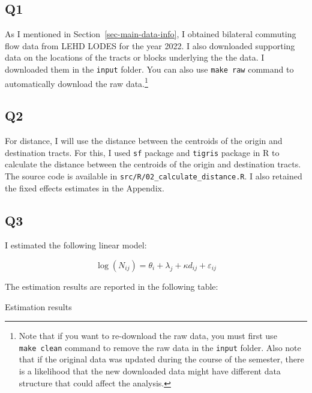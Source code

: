 \documentclass[
  11pt]{article}
\begin{document}
\subsection*{Q1}\label{q1}

As I mentioned in Section~\ref{sec-main-data-info}, I obtained bilateral
commuting flow data from LEHD LODES for the year 2022. I also downloaded
supporting data on the locations of the tracts or blocks underlying the
the data. I downloaded them in the \texttt{input} folder. You can also
use \texttt{make\ raw} command to automatically download the raw
data.\footnote{Note that if you want to re-download the raw data, you
  must first use \texttt{make\ clean} command to remove the raw data in
  the \texttt{input} folder. Also note that if the original data was
  updated during the course of the semester, there is a likelihood that
  the new downloaded data might have different data structure that could
  affect the analysis.}

\subsection*{Q2}\label{q2}

For distance, I will use the distance between the centroids of the
origin and destination tracts. For this, I used \texttt{sf} package and
\texttt{tigris} package in R to calculate the distance between the
centroids of the origin and destination tracts. The source code is
available in \texttt{src/R/02\_calculate\_distance.R}. I also retained
the fixed effects estimates in the Appendix.

\subsection*{Q3}\label{q3}

I estimated the following linear model:

\[
\log(N_{ij}) = \theta_{i} + \lambda_{j} + \kappa d_{ij} + \varepsilon_{ij}\label{eq:distance}
\]

The estimation results are reported in the following table:

\clearpage

\begin{table}[!ht]
\centering
\caption{Estimation results}
\label{tab:est_results}

\end{table}
\end{document}
